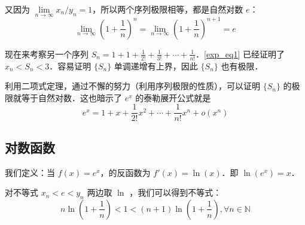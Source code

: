 又因为 $\lim\limits_{n\rightarrow \infty} x_n/y_n = 1$，所以两个序列极限相等，都是自然对数 $e$：
\begin{equation}\label{exp_eq2}
\lim\limits_{n\rightarrow \infty} \left(1+\frac{1}{n}\right)^n=\lim\limits_{n\rightarrow \infty} \left(1+\frac{1}{n}\right)^{n+1}=e
\end{equation}

现在来考察另一个序列 $S_n=1+1+\frac{1}{2!}+\frac{1}{3!}+\cdots+\frac{1}{n!}$．\autoref{exp_eq1} 已经证明了 $x_n<S_n<3$．容易证明 $\{S_n\}$ 单调递增有上界，因此 $\{S_n\}$ 也有极限．

利用二项式定理，通过不懈的努力（利用序列极限的性质），可以证明 $\{S_n\}$ 的极限就等于自然对数．这也暗示了 $e^x$ 的泰勒展开公式就是
\begin{equation}
e^x=1+x+\frac{1}{2!}x^2+\cdots+\frac{1}{n!}x^n +o(x^n)
\end{equation}

\subsection{对数函数}
我们定义：当 $f(x)=e^x$，的反函数为 $f'(x)=\ln(x)$．即 $\ln(e^x)=x$．

对不等式 $x_n<e<y_n$ 两边取 $\ln$ ，我们可以得到不等式：
\begin{equation}
  n\ln\left(1+\frac{1}{n}\right)<1<(n+1)\ln\left(1+\frac{1}{n}\right), \forall n \in \mathbb{N}
\end{equation}

